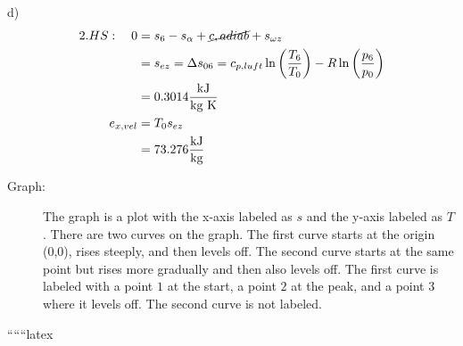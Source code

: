 d)
\begin{align*}
2. HS: \quad 0 &= s_6 - s_{\alpha} + \cancel{c, adiab} + s_{\omega z} \\
&= s_{e z} = \Delta s_{0 6} = c_{p,luft} \ln \left( \frac{T_6}{T_0} \right) - R \ln \left( \frac{p_6}{p_0} \right) \\
&= 0.3014 \frac{\text{kJ}}{\text{kg K}} \\
e_{x,vel} &= T_0 s_{e z} \\
&= 73.276 \frac{\text{kJ}}{\text{kg}}
\end{align*}

\begin{description}
\item[Graph:] The graph is a plot with the x-axis labeled as $s$ and the y-axis labeled as $T$. There are two curves on the graph. The first curve starts at the origin (0,0), rises steeply, and then levels off. The second curve starts at the same point but rises more gradually and then also levels off. The first curve is labeled with a point $1$ at the start, a point $2$ at the peak, and a point $3$ where it levels off. The second curve is not labeled.
\end{description}

``````latex